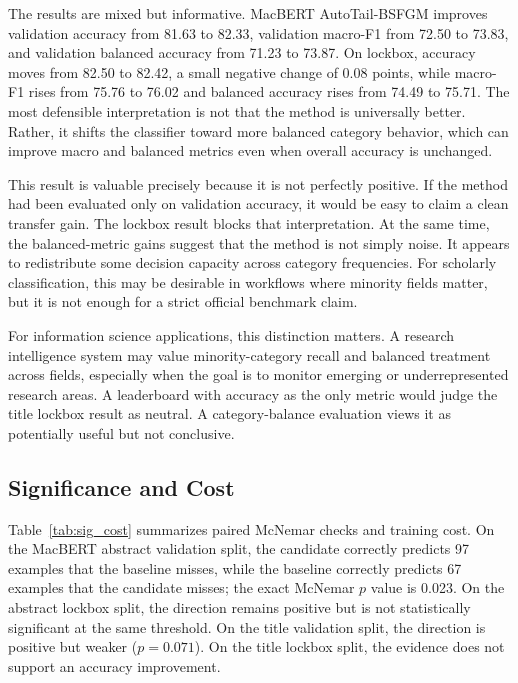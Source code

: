 \documentclass[10pt]{article}
\begin{document}
The results are mixed but informative. MacBERT AutoTail-BSFGM improves validation accuracy from 81.63 to 82.33, validation macro-F1 from 72.50 to 73.83, and validation balanced accuracy from 71.23 to 73.87. On lockbox, accuracy moves from 82.50 to 82.42, a small negative change of 0.08 points, while macro-F1 rises from 75.76 to 76.02 and balanced accuracy rises from 74.49 to 75.71. The most defensible interpretation is not that the method is universally better. Rather, it shifts the classifier toward more balanced category behavior, which can improve macro and balanced metrics even when overall accuracy is unchanged.

This result is valuable precisely because it is not perfectly positive. If the method had been evaluated only on validation accuracy, it would be easy to claim a clean transfer gain. The lockbox result blocks that interpretation. At the same time, the balanced-metric gains suggest that the method is not simply noise. It appears to redistribute some decision capacity across category frequencies. For scholarly classification, this may be desirable in workflows where minority fields matter, but it is not enough for a strict official benchmark claim.

For information science applications, this distinction matters. A research intelligence system may value minority-category recall and balanced treatment across fields, especially when the goal is to monitor emerging or underrepresented research areas. A leaderboard with accuracy as the only metric would judge the title lockbox result as neutral. A category-balance evaluation views it as potentially useful but not conclusive.

\subsection{Significance and Cost}

Table~\ref{tab:sig_cost} summarizes paired McNemar checks and training cost. On the MacBERT abstract validation split, the candidate correctly predicts 97 examples that the baseline misses, while the baseline correctly predicts 67 examples that the candidate misses; the exact McNemar $p$ value is 0.023. On the abstract lockbox split, the direction remains positive but is not statistically significant at the same threshold. On the title validation split, the direction is positive but weaker ($p=0.071$). On the title lockbox split, the evidence does not support an accuracy improvement.

\begin{table}[t]
\centering
\caption{Prediction-derived paired checks and training-cost ratios. McNemar counts are pooled over the three reported seeds for MacBERT comparisons.}
\label{tab:sig_cost}

\end{table}
\end{document}
